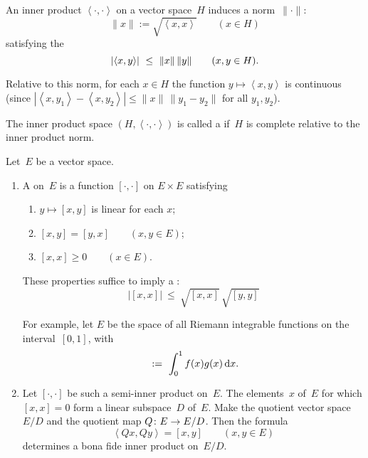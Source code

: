 \documentclass[main.tex]{subfiles}
\begin{document}
\begin{psec}{5.2}%
An inner product $\left<\cdot,\cdot\right>$
on a vector space~$H$
induces a norm~$\|\cdot\|$:
\begin{equation*}
\|x\|:=\sqrt{\left<x,x\right>}\qquad(x\in H)
\end{equation*}
satisfying the 
\begin{equation*}
\left|\left<x,y\right>\right| \ \leq\ \|x\|\,\|y\|\qquad(x,y\in H)\htam{.}
\end{equation*}

Relative to this norm,
for each $x\in H$
the function $y\mapsto \left<x,y\right>$ is continuous
(since $\left|\left<x,y_1\right>-\left<x,y_2\right>\right|
\leq\|x\|\,\|y_1 - y_2\|$ for all $y_1,y_2$).

The inner product space $(H,\left<\cdot,\cdot\right>)$ 
is called a 
if~$H$ is complete relative to the inner product norm.
\end{psec}
%
%
\begin{psec}{5.3}%
Let~$E$ be a vector space.
\begin{enumerate}%
\item\label{5.3-1}%
A  on~$E$ is a function $[\cdot,\cdot]$
on $E\times E$ satisfying
\begin{enumerate}[label={},itemindent=2em,labelindent=2em]
\item $y\mapsto [x,y]$ is linear for each $x$;
\item $[x,y]=[y,x]\qquad(x,y\in E)$;
\item $[x,x]\geq 0\qquad(x\in E)$.
\end{enumerate}
These properties suffice to 
imply a :
\begin{equation*}
|[x,x]|\ \leq\ \sqrt{[x,x]}\,\sqrt{[y,y]}
\end{equation*}

For example,
let $E$ be the space of all Riemann integrable functions
on the interval~$[0,1]$, with
\begin{equation*}
[f,g]\ :=\ \int_0^1 f(x)g(x)\,\mathrm{d}x\htam{.}
\end{equation*}
%
\item \label{5.3-2}
Let $[\cdot,\cdot]$ be such a semi-inner product on~$E$.
The elements~$x$ of~$E$ for which $[x,x]=0$
form a linear subspace~$D$ of~$E$.
Make the quotient vector space~$E/D$
and the quotient map $Q\colon E\rightarrow E/D$.
Then the formula
\begin{equation*}
\left< Qx,Qy \right> = [x,y]\qquad (x,y\in E)
\end{equation*}
determines a bona fide inner product on~$E/D$.
\end{enumerate}
\end{psec}
\end{document}

